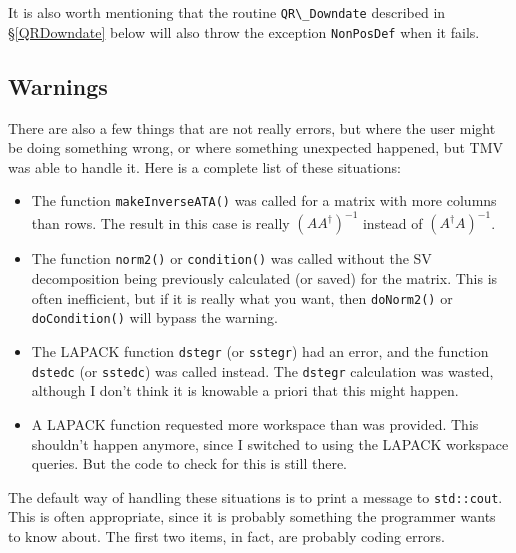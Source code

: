\documentclass[twoside,letterpaper,11pt]{article}
\renewcommand{\tt}[1]{{\lstinline {#1}}}
\begin{document}
It is also worth mentioning that the routine \tt{QR\_Downdate} described in \S\ref{QRDowndate}
below will also throw the exception \tt{NonPosDef} when it fails.

\subsection{Warnings}
\label{Warnings}

There are also a few things that are not really errors, but where the user might be doing
something wrong, or where something unexpected happened, but TMV was able to handle it.
Here is a complete list of these situations:
\begin{itemize}
\item The function \tt{makeInverseATA()} was called for a matrix with more columns than rows.
The result in this case is really $(AA^\dagger)^{-1}$ instead of $(A^\dagger A)^{-1}$.
\item The function \tt{norm2()} or \tt{condition()} was called without the SV decomposition
being previously calculated (or saved) for the matrix.  This is often inefficient, but if it is really what you
want, then \tt{doNorm2()} or \tt{doCondition()} will bypass the warning.
\item The LAPACK function \tt{dstegr} (or \tt{sstegr}) had an error, and the function
\tt{dstedc} (or \tt{sstedc}) was called instead.  The \tt{dstegr} calculation was wasted,
although I don't think it is knowable a priori that this might happen.
\item A LAPACK function requested more workspace than was provided.  This shouldn't happen
anymore, since I switched to using the LAPACK workspace queries.  But the code to check
for this is still there.
\end{itemize}

The default way of handling these situations is to print a message to \tt{std::cout}.  This is often
appropriate, since it is probably something the programmer wants to know about.
The first two items, in fact, are probably coding errors.
\end{document}
